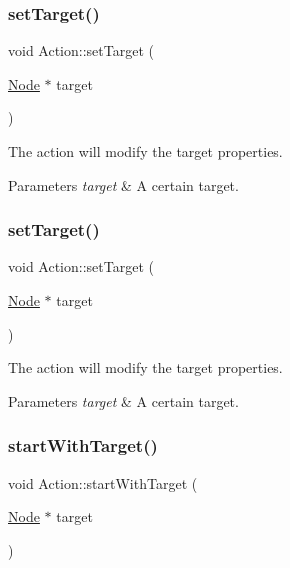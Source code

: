\subsubsection{\texorpdfstring{set\+Target()}{setTarget()}\hspace{0.1cm}{\footnotesize\ttfamily [1/2]}}
{\footnotesize\ttfamily void Action\+::set\+Target (\begin{DoxyParamCaption}\item[{\hyperlink{classNode}{Node} $\ast$}]{target }\end{DoxyParamCaption})\hspace{0.3cm}{\ttfamily [inline]}}

The action will modify the target properties.


\begin{DoxyParams}{Parameters}
{\em target} & A certain target. \\
\hline
\end{DoxyParams}
\mbox{\label{classAction_abd61e00e97d9604126cf149112b877de}} 
\subsubsection{\texorpdfstring{set\+Target()}{setTarget()}\hspace{0.1cm}{\footnotesize\ttfamily [2/2]}}
{\footnotesize\ttfamily void Action\+::set\+Target (\begin{DoxyParamCaption}\item[{\hyperlink{classNode}{Node} $\ast$}]{target }\end{DoxyParamCaption})\hspace{0.3cm}{\ttfamily [inline]}}

The action will modify the target properties.


\begin{DoxyParams}{Parameters}
{\em target} & A certain target. \\
\hline
\end{DoxyParams}
\mbox{\label{classAction_a5457090e4a035c6283777c893a9a681b}} 
\subsubsection{\texorpdfstring{start\+With\+Target()}{startWithTarget()}\hspace{0.1cm}{\footnotesize\ttfamily [1/2]}}
{\footnotesize\ttfamily void Action\+::start\+With\+Target (\begin{DoxyParamCaption}\item[{\hyperlink{classNode}{Node} $\ast$}]{target }\end{DoxyParamCaption})\hspace{0.3cm}{\ttfamily [virtual]}}

